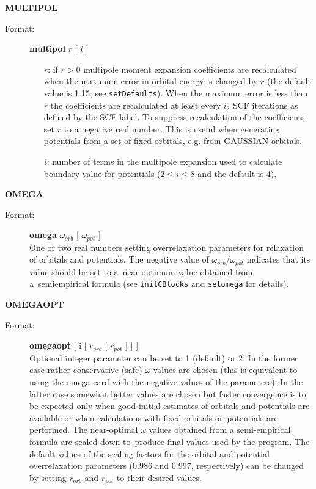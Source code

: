 \documentclass[12pt,a4paper]{article}
\newcommand{\ft}[1]{\texttt{#1}}
\begin{document}
\begin{description}
\begin{description}
\begin{itemize}
\end{itemize} 
\end{description} 


\item \textbf{MULTIPOL} 
\begin{description} 
\item[Format:] \textbf{multipol} $r$ [ $i$ ] 
\begin{itemize}
\item[$r$:] if $r>0$ multipole moment expansion coefficients are recalculated when the
  maximum error in orbital energy is changed by $r$ (the default value is 1.15; see
  \ft{setDefaults}). When the maximum error is less than $r$ the coefficients are
  recalculated at least every $i_2$ SCF iterations as defined by the SCF label. To
  suppress recalculation of the coefficients set $r$ to a negative real number. This is
  useful when generating potentials from a set of fixed orbitals, e.g. from GAUSSIAN
  orbitals.

\item[$i$:] number of terms in the multipole expansion used to calculate
  boundary value for potentials ($2 \le i\le 8$ and the default is 4).
\end{itemize} 
\end{description} 


\item \textbf{OMEGA}
\begin{description} 
\item[Format:] \textbf{omega} $\omega_{orb}$ [ $\omega_{pot}$ ] \\ One or two real numbers
  setting overrelaxation parameters for relaxation of orbitals and potentials. The
  negative value of $\omega_{orb}$/$\omega_{pot}$ indicates that its value should be
  set to a~near optimum value obtained from a~semiempirical formula (see \ft{initCBlocks}
  and \ft{setomega} for details). 
\end{description}

\item \textbf{OMEGAOPT}
\begin{description} 
\item[Format:] \textbf{omegaopt} [ i [ $r_{orb}$ [ $r_{pot}$ ] ] ] \\ Optional integer
  parameter can be set to 1 (default) or 2. In the former case rather conservative (safe)
  $\omega$ values are chosen (this is equivalent to using the omega card with the negative
  values of the parameters). In the latter case somewhat better values are chosen but
  faster convergence is to be expected only when good initial estimates of orbitals and
  potentials are available or when calculations with fixed orbitals or~potentials are
  performed. The near-optimal $\omega$ values obtained from a semi-empirical formula are
  scaled down to~produce final values used by the program. The default values of the
  scaling factors for the orbital and potential overrelaxation parameters (0.986 and
  0.997, respectively) can be changed by setting $r_{orb}$ and $r_{pot}$ to their desired
  values.
\end{description}


\end{description}
\end{document}
